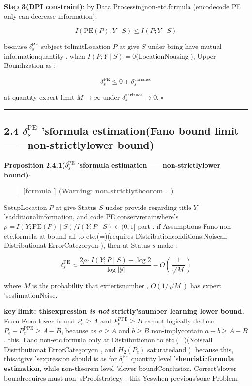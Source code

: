 \documentclass[
  12pt,
]{article}
\begin{document}
\textbf{Step 3(DPI constraint)}: by Data Processingnon-etc.formula (encodecode  PE only can decrease information):

\[I(\text{PE}(P); Y \mid S) \leq I(P; Y \mid S)\]

because  \(\delta_s^{\text{PE}}\) subject tolimitLocation \(P\) at give  \(S\)
under bring have mutual informationquantity . when  \(I(P; Y \mid S) = 0\)(LocationNousing ), Upper Boundization as : 

\[\delta_s^{\text{PE}} \leq 0 + \delta_s^{\text{variance}}\]

at quantity expert limit \(M \to \infty\) under 
\(\delta_s^{\text{variance}} \to 0\). \(\square\)

\begin{center}\rule{0.5\linewidth}{0.5pt}\end{center}

\subsection{\texorpdfstring{2.4 \(\delta_s^{\text{PE}}\)
'sformula estimation(Fano
bound limit------non-strictlylower bound)}{2.4 \textbackslash delta\_s\^{}\{\textbackslash text\{PE\}\} 'sformula estimation(Fano bound limit------non-strictlylower bound)}}\label{delta_stextpe-ux7684ux542fux53d1ux5f0fux4f30ux8ba1fano-ux754cux9650ux975eux4e25ux683cux4e0bux754c}

\textbf{Proposition 2.4.1(\(\delta_s^{\text{PE}}\)
'sformula estimation------non-strictlylower bound)}: 

\begin{quote}
\textbf{{[}formula {]}} \textbf{(Warning: non-strictlytheorem . )}
\end{quote}

SetupLocation \(P\) at give Status \(S\) under provide regarding title  \(Y\) 'sadditionalinformation, and code  PE
conservretainwhere's
\(\rho = I(Y; \text{PE}(P) \mid S) / I(Y; P \mid S) \in (0, 1]\)
part . if Assumptions Fano
non-etc.formula at bound all to etc.(=)(requires Distributionconditions:Noiseall Distributionat ErrorCategoryon ), then at Status
\(s\) make : 

\[\delta_s^{\text{PE}} \approx \frac{2\rho \cdot I(Y; P \mid S) - \log 2}{\log |\mathcal{Y}|} - O\left(\frac{1}{\sqrt{M}}\right)\]

where \(M\) is the probability that expertsnumber , \(O(1/\sqrt{M})\) has expert 'sestimationNoise. 

\textbf{key limit: thisexpression  \emph{is not} strictly'snumber learning lower bound. } From Fano
lower bound \(P_e \geq A\) and  \(P_e^{\text{PPE}} \geq B\) cannot logically deduce
\(P_e - P_e^{\text{PPE}} \geq A - B\), because as  \(a \geq A\) and  \(b \geq B\)
non-implycontain \(a-b \geq A-B\). this, Fano
non-etc.formula only at Distributionon to etc.(=)(Noiseall Distributionat ErrorCategoryon , and  \(H_2(P_e)\)
saturatedand ). because this, thisatgive 'sexpression should is as for  \(\delta_s^{\text{PE}}\)
quantity level 's\textbf{heuristicformula estimation}, while non-theorem level 'slower boundConclusion. Correct'slower boundrequires must non-'sProofstrategy , this Yeswhen previous'sone Problem. 
\end{document}
